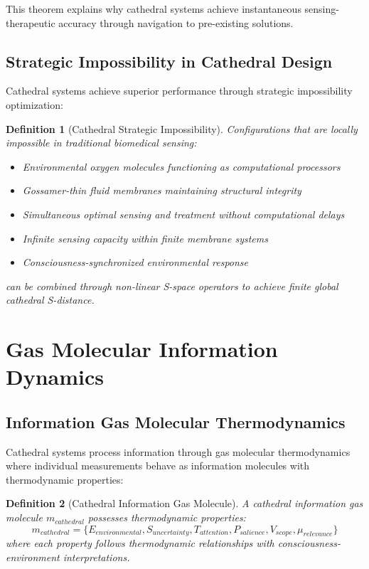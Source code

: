 \documentclass[12pt,a4paper]{article}
\newtheorem{definition}{Definition}
\begin{document}
This theorem explains why cathedral systems achieve instantaneous sensing-therapeutic accuracy through navigation to pre-existing solutions.

\subsection{Strategic Impossibility in Cathedral Design}

Cathedral systems achieve superior performance through strategic impossibility optimization:

\begin{definition}[Cathedral Strategic Impossibility]
Configurations that are locally impossible in traditional biomedical sensing:
\begin{itemize}
\item Environmental oxygen molecules functioning as computational processors
\item Gossamer-thin fluid membranes maintaining structural integrity
\item Simultaneous optimal sensing and treatment without computational delays
\item Infinite sensing capacity within finite membrane systems
\item Consciousness-synchronized environmental response
\end{itemize}
can be combined through non-linear S-space operators to achieve finite global cathedral S-distance.
\end{definition}

\section{Gas Molecular Information Dynamics}

\subsection{Information Gas Molecular Thermodynamics}

Cathedral systems process information through gas molecular thermodynamics where individual measurements behave as information molecules with thermodynamic properties:

\begin{definition}[Cathedral Information Gas Molecule]
A cathedral information gas molecule $m_{cathedral}$ possesses thermodynamic properties:
\begin{equation}
m_{cathedral} = \{E_{environmental}, S_{uncertainty}, T_{attention}, P_{salience}, V_{scope}, \mu_{relevance}\}
\end{equation}
where each property follows thermodynamic relationships with consciousness-environment interpretations.
\end{definition}
\end{document}
